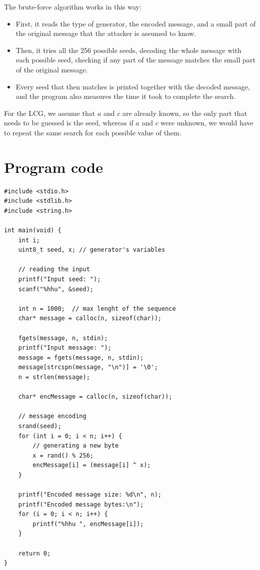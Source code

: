 \documentclass[a4paper,10pt]{article}
\begin{document}
The brute-force algorithm works in this way:
\begin{itemize}
    \item First, it reads the type of generator, the encoded message, and a small part of the original message that the attacker is assumed to know.
    \item Then, it tries all the 256 possible seeds, decoding the whole message with each possible seed, checking if any part of the message matches the small part of the original message.
    \item Every seed that then matches is printed together with the decoded message, and the program also measures the time it took to complete the search.
\end{itemize}
For the LCG, we assume that $a$ and $c$ are already known, so the only part that needs to be guessed is the seed, whereas if $a$ and $c$ were unknown, we would have to repeat the same search for each possible value of them.

\newpage

\section{Program code}
\begin{lstlisting}[style = code, title = random\_encode.c]
#include <stdio.h>
#include <stdlib.h>
#include <string.h>

int main(void) {
    int i;
    uint8_t seed, x; // generator's variables

    // reading the input
    printf("Input seed: ");
    scanf("%hhu", &seed);

    int n = 1000;  // max lenght of the sequence
    char* message = calloc(n, sizeof(char));

    fgets(message, n, stdin);
    printf("Input message: ");
    message = fgets(message, n, stdin);
    message[strcspn(message, "\n")] = '\0';
    n = strlen(message);

    char* encMessage = calloc(n, sizeof(char));

    // message encoding
    srand(seed);
    for (int i = 0; i < n; i++) {
        // generating a new byte
        x = rand() % 256;
        encMessage[i] = (message[i] ^ x);
    }

    printf("Encoded message size: %d\n", n);
    printf("Encoded message bytes:\n");
    for (i = 0; i < n; i++) {
        printf("%hhu ", encMessage[i]);
    }

    return 0;
}

\end{lstlisting}
\end{document}
